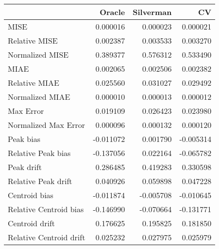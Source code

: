 \begin{tabular}{lrrr}
  \hline
 & Oracle & Silverman & CV \\ 
  \hline
MISE & 0.000016 & 0.000023 & 0.000021 \\ 
  Relative MISE & 0.002387 & 0.003533 & 0.003270 \\ 
  Normalized MISE & 0.389377 & 0.576312 & 0.533490 \\ 
  MIAE & 0.002065 & 0.002506 & 0.002382 \\ 
  Relative MIAE & 0.025560 & 0.031027 & 0.029492 \\ 
  Normalized MIAE & 0.000010 & 0.000013 & 0.000012 \\ 
  Max Error & 0.019109 & 0.026423 & 0.023980 \\ 
  Normalized Max Error & 0.000096 & 0.000132 & 0.000120 \\ 
  Peak bias & -0.011072 & 0.001790 & -0.005314 \\ 
  Relative Peak bias & -0.137056 & 0.022164 & -0.065782 \\ 
  Peak drift & 0.286485 & 0.419283 & 0.330598 \\ 
  Relative Peak drift & 0.040926 & 0.059898 & 0.047228 \\ 
  Centroid bias & -0.011874 & -0.005708 & -0.010645 \\ 
  Relative Centroid bias & -0.146990 & -0.070664 & -0.131771 \\ 
  Centroid drift & 0.176625 & 0.195825 & 0.181850 \\ 
  Relative Centroid drift & 0.025232 & 0.027975 & 0.025979 \\ 
   \hline
\end{tabular}
